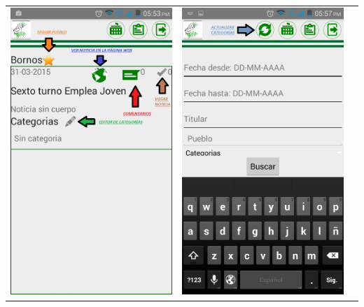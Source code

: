 \begin{tabular}{p{7cm}p{8mm}p{7cm}}
\\
\includegraphics[width=6.5cm]{./android/imagenes/botones3.png}

&
\includegraphics[width=6.5cm]{./android/imagenes/botones4.png}
\\
\end{tabular}


